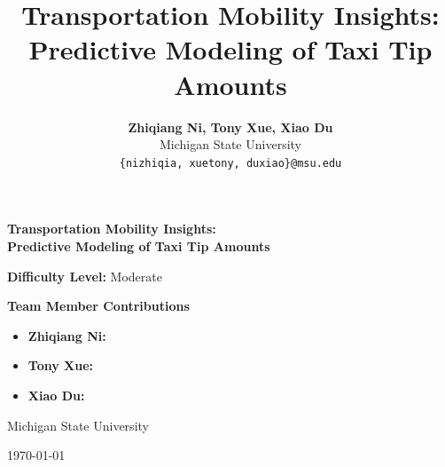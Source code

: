 \documentclass[11pt]{article}
\title{Transportation Mobility Insights: Predictive Modeling of Taxi Tip Amounts}
\author{
  \textbf{Zhiqiang Ni, Tony Xue, Xiao Du} \\
  \vspace{0.25em}
  Michigan State University \\
  \texttt{\{nizhiqia, xuetony, duxiao\}@msu.edu} %
}
\begin{document}
\begin{titlepage}
    \centering
    \vspace*{2cm}

    {\Huge \textbf{Transportation Mobility Insights: \\ Predictive Modeling of Taxi Tip Amounts} \par}

    \vspace{2.5cm}

    {\LARGE \textbf{Difficulty Level:} Moderate \par}

    \vspace{2.5cm}

    {\Large \textbf{Team Member Contributions} \par}
    \vspace{1cm}

    \begin{itemize}[label={}, leftmargin=0.25\textwidth]
        \item \textbf{Zhiqiang Ni:} 
        \vspace{0.5cm}
        \item \textbf{Tony Xue:} 
        \vspace{0.5cm}
        \item \textbf{Xiao Du:} 
    \end{itemize}

    \vfill

    {\large Michigan State University \par}
    \vspace{0.5cm}
    {\large \today \par}

    \vspace*{1cm}
\end{titlepage}
\maketitle
\end{document}
